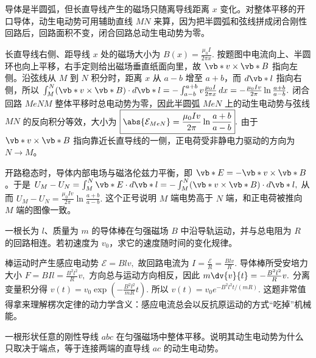 \documentclass[lang=cn,11pt]{elegantbook}
\begin{document}
\begin{solution}
导体是半圆弧，但长直导线产生的磁场只随离导线距离 \(x\) 变化。对整体平移的开口导体，动生电动势可用辅助直线 \(MN\) 来算，因为把半圆弧和弦线拼成闭合刚性回路后，回路面积不变，闭合回路总动生电动势为零。

长直导线右侧、距导线 \(x\) 处的磁场大小为
 \(B(x)=\frac{\mu_0 I}{2\pi x}.\) 
按题图中电流向上、半圆环也向上平移，右手定则给出磁场垂直纸面向里，故 \(\vb*{v}\times\vb*{B}\) 指向左侧。沿弦线从 \(M\) 到 \(N\) 积分时，距离 \(x\) 从 \(a-b\) 增至 \(a+b\)，而 \(d\vb*{l}\) 指向右侧，所以
 \(\int_M^N(\vb*{v}\times\vb*{B})\cdot d\vb*{l} =-\int_{a-b}^{a+b}v\frac{\mu_0 I}{2\pi x}\,dx =-\frac{\mu_0 I v}{2\pi}\ln\frac{a+b}{a-b}.\) 
闭合回路 \(MeNM\) 整体平移时总电动势为零，因此半圆弧 \(MeN\) 上的动生电动势与弦线 \(MN\) 的反向积分等效，大小为
 \(\boxed{ \abs{\mathcal{E}_{MeN}} =\frac{\mu_0 I v}{2\pi}\ln\frac{a+b}{a-b} }.\) 
由于 \(\vb*{v}\times\vb*{B}\) 指向靠近长直导线的一侧，正电荷受非静电力驱动的方向为 \(N\to M\)。

开路稳态时，导体内部电场与磁洛伦兹力平衡，即 \(\vb*{E}=-\vb*{v}\times\vb*{B}\)。于是
 \(U_M-U_N=\int_M^N\vb*{E}\cdot d\vb*{l} =-\int_M^N(\vb*{v}\times\vb*{B})\cdot d\vb*{l},\) 
从而
 \(\boxed{ U_M-U_N= \frac{\mu_0 I v}{2\pi}\ln\frac{a+b}{a-b} }.\) 
这个正号说明 \(M\) 端电势高于 \(N\) 端，和正电荷被推向 \(M\) 端的图像一致。
\end{solution}

\begin{exercise}[磁场中的导体棒为何会指数减速]
一根长为 \(l\)、质量为 \(m\) 的导体棒在匀强磁场 \(B\) 中沿导轨运动，并与总电阻为 \(R\) 的回路相连。若初速度为 \(v_0\)，求它的速度随时间的变化规律。
\end{exercise}

\begin{solution}
棒运动时产生感应电动势
 \(\mathcal{E}=Blv,\) 
故回路电流为
 \(I=\frac{\mathcal{E}}{R}=\frac{Blv}{R}.\) 
导体棒所受安培力大小
 \(F=BIl=\frac{B^2l^2}{R}v,\) 
方向总与运动方向相反，因此
 \(m\dv{v}{t}=-\frac{B^2l^2}{R}v.\) 
分离变量积分得
 \(v(t)=v_0\exp\left(-\frac{B^2l^2}{mR}t\right).\) 
所以
 \(\boxed{ v(t)=v_0e^{-B^2l^2t/(mR)} }.\) 
这题非常值得拿来理解楞次定律的动力学含义：感应电流总会以反抗原运动的方式“吃掉”机械能。
\end{solution}

\begin{exercise}[折线导线的动生电动势为何等于两端弦线]
一根形状任意的刚性导线 \(abc\) 在匀强磁场中整体平移。说明其动生电动势为什么只取决于端点，等于连接两端的直导线 \(ac\) 的动生电动势。
\end{exercise}
\end{document}
